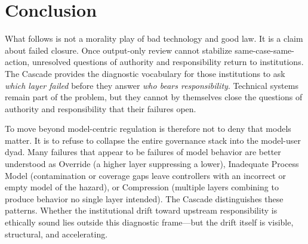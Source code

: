 \section{Conclusion}

What follows is not a morality play of bad technology and good law. It is a claim about failed closure. Once output-only review cannot stabilize same-case-same-action, unresolved questions of authority and responsibility return to institutions. The Cascade provides the diagnostic vocabulary for those institutions to ask \textit{which layer failed} before they answer \textit{who bears responsibility}. Technical systems remain part of the problem, but they cannot by themselves close the questions of authority and responsibility that their failures open.

To move beyond model-centric regulation is therefore not to deny that models matter. It is to refuse to collapse the entire governance stack into the model-user dyad. Many failures that appear to be failures of model behavior are better understood as Override (a higher layer suppressing a lower), Inadequate Process Model (contamination or coverage gaps leave controllers with an incorrect or empty model of the hazard), or Compression (multiple layers combining to produce behavior no single layer intended). The Cascade distinguishes these patterns. Whether the institutional drift toward upstream responsibility is ethically sound lies outside this diagnostic frame---but the drift itself is visible, structural, and accelerating.

